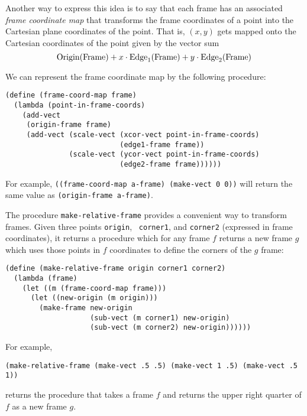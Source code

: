 Another way to express this idea is to say that each frame has an
associated {\em frame coordinate map} that transforms the frame
coordinates of a point into the Cartesian plane coordinates of the
point.  That is, $(x,y)$ gets mapped onto the Cartesian
coordinates of the point given by the vector sum
\begin{displaymath}
\hbox{\rm Origin(Frame)} + x\cdot \hbox{\rm Edge}_1\hbox{\rm (Frame)}
+ y\cdot \hbox{\rm Edge}_2\hbox{\rm (Frame)} 
\end{displaymath}

We can represent the frame coordinate map by the following procedure:\\
\begin{verbatim}
(define (frame-coord-map frame)
  (lambda (point-in-frame-coords)
    (add-vect
     (origin-frame frame)
     (add-vect (scale-vect (xcor-vect point-in-frame-coords)
                           (edge1-frame frame))
               (scale-vect (ycor-vect point-in-frame-coords)
                           (edge2-frame frame))))))
\end{verbatim}

For example, {\tt ((frame-coord-map a-frame) (make-vect 0 0))} will
return the same value as {\tt (origin-frame a-frame)}.

The procedure {\tt make-relative-frame} provides a convenient way to
transform frames.  Given three points {\tt origin}, {\tt
corner1}, and {\tt corner2} (expressed in frame coordinates), it
returns a procedure which for any frame $f$ returns a new frame $g$
which uses those points in $f$ coordinates to define the corners of
the $g$ frame:

\begin{verbatim}
(define (make-relative-frame origin corner1 corner2)
  (lambda (frame)
    (let ((m (frame-coord-map frame)))
      (let ((new-origin (m origin)))
        (make-frame new-origin
                    (sub-vect (m corner1) new-origin)
                    (sub-vect (m corner2) new-origin))))))
\end{verbatim}

\noindent
For example,\\
\begin{verbatim}
(make-relative-frame (make-vect .5 .5) (make-vect 1 .5) (make-vect .5 1))
\end{verbatim}

\noindent
returns the procedure that takes a frame $f$ and returns the upper
right quarter of $f$ as a new frame $g$.

